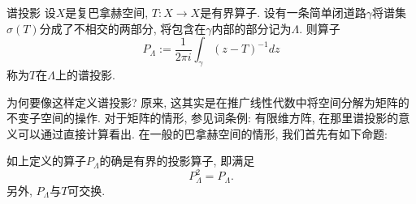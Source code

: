 

\begin{definition}{谱投影}
设$X$是复巴拿赫空间, $T:X\to X$是有界算子. 设有一条简单闭道路$\gamma$将谱集$\sigma(T)$分成了不相交的两部分, 将包含在$\gamma$内部的部分记为$\Lambda$. 则算子
$$
P_\Lambda:=\frac{1}{2\pi i}\int_\gamma(z-T)^{-1}dz
$$
称为$T$在$\Lambda$上的谱投影.
\end{definition}

为何要像这样定义谱投影? 原来, 这其实是在推广线性代数中将空间分解为矩阵的不变子空间的操作. 对于矩阵的情形, 参见词条例: 有限维方阵, 在那里谱投影的意义可以通过直接计算看出. 在一般的巴拿赫空间的情形, 我们首先有如下命题:

\begin{lemma}{}
如上定义的算子$P_\Lambda$的确是有界的投影算子, 即满足
$$
P_\Lambda^2=P_\Lambda.
$$
另外, $P_\Lambda$与$T$可交换.
\end{lemma}